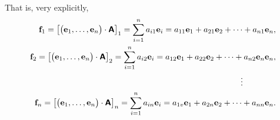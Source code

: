 That is, very explicitly,
\begin{equation}
\begin{split}
{\bf f}_1=
\left[\begin{pmatrix}{\bf e}_1,\ldots ,{\bf e}_n\end{pmatrix} \cdot \textsf{\textbf{A}}\right]_1     = \sum_{i=1}^n a_{i1} {\bf e}_i
=
a_{11} {\bf e}_1 + a_{21} {\bf e}_2+\cdots + a_{n1} {\bf e}_n,\\
{\bf f}_2=
\left[\begin{pmatrix}{\bf e}_1,\ldots ,{\bf e}_n\end{pmatrix} \cdot \textsf{\textbf{A}}\right]_2=
 \sum_{i=1}^n a_{i2} {\bf e}_i
=
a_{12} {\bf e}_1 + a_{22} {\bf e}_2+\cdots + a_{n2} {\bf e}_n {\bf e}_n ,\\
 \vdots \qquad \qquad \\
{\bf f}_n=
\left[\begin{pmatrix}{\bf e}_1,\ldots ,{\bf e}_n\end{pmatrix} \cdot \textsf{\textbf{A}}\right]_n      = \sum_{i=1}^n a_{in} {\bf e}_i
= a_{1v} {\bf e}_1 + a_{2n} {\bf e}_2+\cdots + a_{nn} {\bf e}_n .
\end{split}
\label{2011-m-btbe-eigen}
\end{equation}


